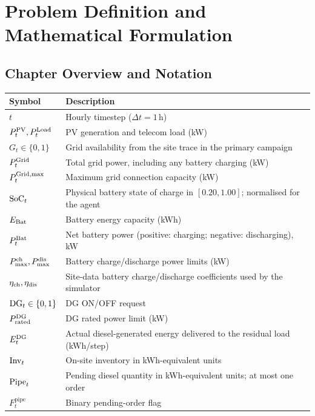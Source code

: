 \chapter{Problem Definition and Mathematical Formulation}
\label{chap:problem}

\section{Chapter Overview and Notation}
\begin{table}[htbp]
\centering
\small
\ifshowrevisions\color{P3Rcolor}\fi
\begin{tabular}{l>{\raggedright\arraybackslash}p{9.8cm}}
\toprule
\textbf{Symbol} & \textbf{Description} \\
\midrule
$t$ & Hourly timestep ($\Delta t=1\,\mathrm{h}$) \\
$P_t^{\mathrm{PV}},P_t^{\mathrm{Load}}$ & PV generation and telecom load (kW) \\
$G_t\in\{0,1\}$ & Grid availability from the site trace in the primary campaign \\
$P_t^{\mathrm{Grid}}$ & Total grid power, including any battery charging (kW) \\
$P_t^{\mathrm{Grid},\max}$ & Maximum grid connection capacity (kW) \\
$\mathrm{SoC}_t$ & Physical battery state of charge in $[0.20,1.00]$; normalised for the agent \\
$E_{\mathrm{Bat}}$ & Battery energy capacity (kWh) \\
$P_t^{\mathrm{Bat}}$ & Net battery power (positive: charging; negative: discharging), kW \\
$P_{\max}^{\mathrm{ch}},P_{\max}^{\mathrm{dis}}$ & Battery charge/discharge power limits (kW) \\
$\eta_{\mathrm{ch}},\eta_{\mathrm{dis}}$ & Site-data battery charge/discharge coefficients used by the simulator \\
$\mathrm{DG}_t\in\{0,1\}$ & DG ON/OFF request \\
$P_{\mathrm{rated}}^{\mathrm{DG}}$ & DG rated power limit (kW) \\
$E_t^{\mathrm{DG}}$ & Actual diesel-generated energy delivered to the residual load (kWh/step) \\
$\mathrm{Inv}_t$ & On-site inventory in kWh-equivalent units \\
$\mathrm{Pipe}_t$ & Pending diesel quantity in kWh-equivalent units; at most one order \\
$F_t^{\mathrm{pipe}}$ & Binary pending-order flag \\

\end{tabular}
\end{table}
